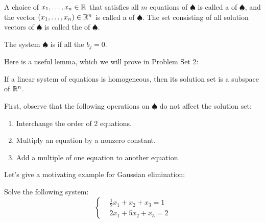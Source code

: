\documentclass[main.tex]{subfiles}
\begin{document}
\begin{definition}
    A choice of $x_1, \ldots , x_n\in \mathbb R$ that satisfies all $m$ equations of $\spadesuit$ is called a  of $\spadesuit$, and the vector $(x_1, \ldots , x_n)\in \mathbb R^n$ is called a  of $\spadesuit$. The set consisting of all solution vectors of $\spadesuit$ is called the  of $\spadesuit$.
\end{definition}

\begin{definition}[Homogeneousness]
    The system $\spadesuit$ is  if all the $b_j = 0$.
\end{definition}

Here is a useful lemma, which we will prove in Problem Set 2:

\begin{lemma}
    If a linear system of equations is homogeneous, then its solution set is a subspace of $\mathbb R^n$.
\end{lemma}

First, observe that the following operations on $\spadesuit$ do not affect the solution set:
\begin{enumerate}
    \item Interchange the order of 2 equations.
    \item Multiply an equation by a nonzero constant.
    \item Add a multiple of one equation to another equation.
\end{enumerate}

Let's give a motivating example for Gaussian elimination:

\begin{example}
    Solve the following system:
    \[\left\{\begin{aligned}
        &\frac{1}{2}x_1 + x_2 + x_3 = 1 \\
        &2x_1 + 5x_2 + x_3 = 2
    \end{aligned}\right.\]
\end{example}
\end{document}
